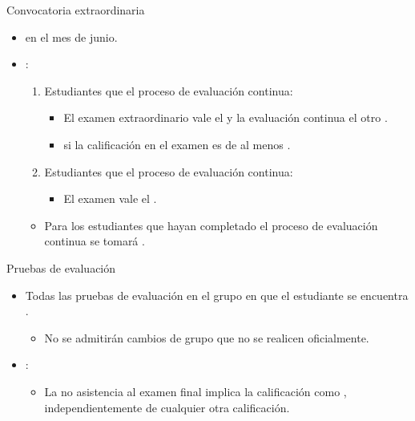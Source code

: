 \begin{frame}[t]{Convocatoria extraordinaria}
\begin{itemize}
  \item {} en el mes de junio.

  \item {}:
    \begin{enumerate}
      \item Estudiantes que  el proceso de evaluación continua:
        \begin{itemize}
          \item El examen extraordinario vale el  
                y la evaluación continua el otro .
          \item {} si la calificación en el examen es de 
                al menos .
        \end{itemize}
      \item Estudiantes que  el proceso de evaluación continua:
        \begin{itemize}
          \item El examen vale el .
        \end{itemize}
    \end{enumerate}

    \begin{itemize}
      \item Para los estudiantes que hayan completado el proceso de evaluación continua 
            se tomará .
    \end{itemize}
\end{itemize}
\end{frame}

\begin{frame}[t]{Pruebas de evaluación}
\begin{itemize}
  \item Todas las pruebas de evaluación  
        en el grupo en que el estudiante se encuentra .
    \begin{itemize}
      \item No se admitirán cambios de grupo que no se realicen oficialmente.
    \end{itemize}

  \item {}:   
\begin{itemize}
      \item La no asistencia al examen final 
            implica la calificación como , 
            independientemente de cualquier otra calificación.
    \end{itemize}
\end{itemize}
\end{frame}
